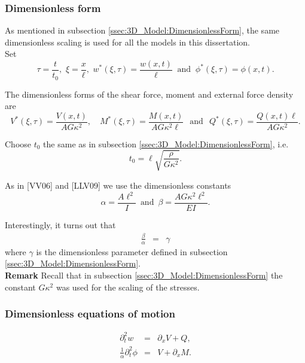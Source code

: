 \documentclass[../../main.tex]{subfiles}
\begin{document}
    \subsubsection*{Dimensionless form}\label{sssec:1D_Model:DimensionlessForm}
    As mentioned in subsection \ref{ssec:3D_Model:DimensionlessForm}, the same dimensionless scaling is used for all the models in this dissertation.\\

    Set \[\tau = \frac{t}{t_0}, \,\, \xi = \frac{x}{\ell}, \,\, w^*(\xi,\tau) = \frac{w(x,t)}{\ell} \ \text{ and } \ \phi^*(\xi, \tau) = \phi(x,t).\]

    The dimensionless forms of the shear force, moment and external force density are \[ V^{*}(\xi,\tau) = \frac{V(x,t)}{AG\kappa^2}, \quad M^{*}(\xi,\tau) = \frac{M(x,t)}{A G\kappa^2 \ell} \,\,\, \ \text{and} \ \,\,\, Q^*(\xi,\tau) = \frac{Q(x,t)\ell}{A G\kappa^2}.\]

    Choose $t_0$ the same as in subsection \ref{ssec:3D_Model:DimensionlessForm}, i.e. \[t_0 = \ell\sqrt{\frac{\rho}{G\kappa^2}}.\]

    As in [VV06] and [LLV09] we use the dimensionless constants
    \begin{equation*}
        \alpha = \frac{A \ell^2}{I} \,\,\, \text{and} \,\,\, \beta
        =\frac{AG\kappa^2 \ell^2}{EI}.
    \end{equation*}

    Interestingly, it turns out that
    \begin{eqnarray*}
        \frac{\beta}{\alpha} & = & \gamma
    \end{eqnarray*} where $\gamma$ is the dimensionless parameter defined in subsection \ref{ssec:3D_Model:DimensionlessForm}.\\

    \textbf{Remark} Recall that in subsection \ref{ssec:3D_Model:DimensionlessForm} the constant $G\kappa^2$ was used for the scaling of the stresses.

    \subsubsection*{Dimensionless equations of motion}\label{sssec:1D_Model:DimensionlessEquationsOfMotion}
    \begin{eqnarray}
        \partial_{t}^{2} w &=& \partial_{x}V + Q, \label{eq:1D_Model:EquationOfMotion1D}\\
        \frac{1}{\alpha} \partial_{t}^{2} \phi &=& V + \partial_{x}M.\label{eq:1D_Model:EquationOfMotion2D}
    \end{eqnarray}
\end{document}
